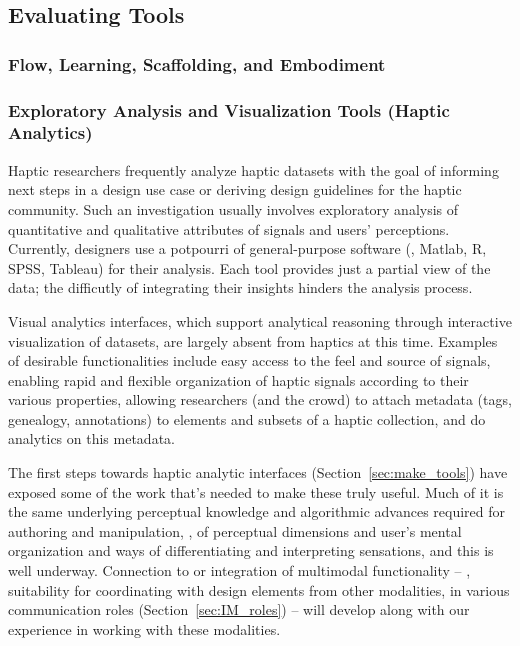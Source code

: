 %
%
\subsection{Evaluating \haxd Tools}


\subsubsection{Flow, Learning, Scaffolding, and Embodiment}




\subsubsection{Exploratory Analysis and Visualization Tools (Haptic Analytics)} 
Haptic researchers frequently analyze haptic datasets with the goal of informing next steps in a design use case or deriving design guidelines for the haptic community. 
Such an  investigation usually involves exploratory analysis of quantitative and qualitative attributes of signals and users' perceptions. 
Currently, designers use a potpourri of general-purpose software (\eg, Matlab, R, SPSS, Tableau) for their analysis. Each tool provides just a partial view of the data; the difficutly of integrating their insights hinders the analysis process. 

Visual analytics interfaces, which support analytical reasoning through interactive visualization of datasets, are largely absent from haptics at this time. 
Examples of desirable functionalities  include easy access to the feel and source of signals, enabling rapid and flexible organization of haptic signals according to their various properties, allowing researchers (and the crowd) to attach metadata (tags, genealogy, annotations) to elements and subsets of a haptic collection, and do analytics on this metadata.


The first steps towards haptic analytic interfaces (Section~\ref{sec:make_tools}) have exposed some of the work that's needed to make these truly useful. Much of it is the same underlying perceptual knowledge and  algorithmic advances required for authoring and manipulation, \eg, of perceptual dimensions and user's mental organization and ways of differentiating and interpreting sensations, and this is well underway. 
%
Connection to or integration of multimodal functionality -- \eg, suitability for coordinating with design elements from other modalities, in various communication roles (Section~\ref{sec:IM_roles}) -- will develop along with our experience in working with these modalities. 



